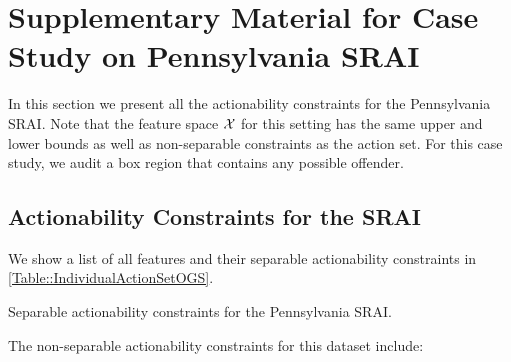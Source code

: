 \section{Supplementary Material for Case Study on Pennsylvania SRAI} \label{app:case_study}

In this section we present all the actionability constraints for the Pennsylvania SRAI. Note that the feature space ${\cal X}$ for this setting has the same upper and lower bounds as well as non-separable constraints as the action set. For this case study, we audit a box region that contains any possible offender.

\subsection{Actionability Constraints for the SRAI} 

We show a list of all features and their separable actionability constraints in \cref{Table::IndividualActionSetOGS}.
\begin{table}[!h]
\centering
\fontsize{9pt}{9pt}\selectfont
\resizebox{0.75\linewidth}{!}{}
\caption{Separable actionability constraints for the Pennsylvania SRAI.}
\label{Table::IndividualActionSetOGS}
\end{table}

The non-separable actionability constraints for this dataset include:

